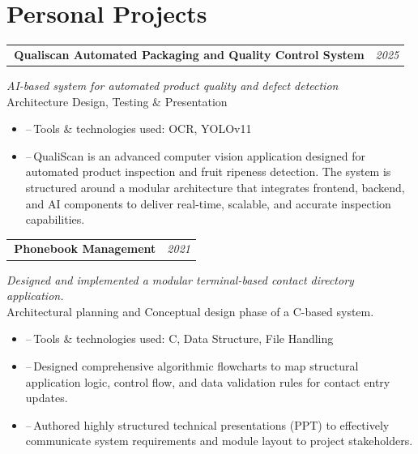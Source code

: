 \documentclass[10pt,a4paper]{article}
\newcommand{\bulletitem}{\textbullet\,}
\newcommand{\dashitem}{\hspace{0.18in}--\,}
\begin{document}
\section{Personal Projects}

\begin{tabularx}{\linewidth}{@{}Xr@{}}
\textbf{\bulletitem Qualiscan Automated Packaging and Quality Control System} & \textit{2025}
\end{tabularx}
{\itshape AI-based system for automated product quality and defect detection}\\
Architecture Design, Testing \& Presentation

\begin{itemize}[leftmargin=0.20in,label={},itemsep=1pt,topsep=5pt,parsep=0pt]
    \item \dashitem Tools \& technologies used: OCR, YOLOv11
    \item \dashitem QualiScan is an advanced computer vision application designed for automated product inspection and fruit ripeness detection. The system is structured around a modular architecture that integrates frontend, backend, and AI components to deliver real-time, scalable, and accurate inspection capabilities.
\end{itemize}

\begin{tabularx}{\linewidth}{@{}Xr@{}}
\textbf{\bulletitem Phonebook Management} & \textit{2021}
\end{tabularx}
{\itshape Designed and implemented a modular terminal-based contact directory application.}\\
Architectural planning and Conceptual design phase of a C-based system.

\begin{itemize}[leftmargin=0.20in,label={},itemsep=1pt,topsep=5pt,parsep=0pt]
    \item \dashitem Tools \& technologies used: C, Data Structure, File Handling
    \item \dashitem Designed comprehensive algorithmic flowcharts to map structural application logic, control flow, and data validation rules for contact entry updates.
    \item \dashitem Authored highly structured technical presentations (PPT) to effectively communicate system requirements and module layout to project stakeholders.
\end{itemize}

\end{document}
